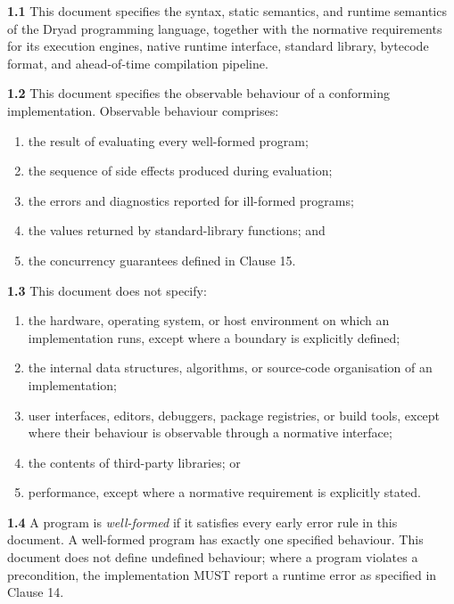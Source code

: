 \documentclass[
  english,
  11pt,
  a4paper,
]{article}
\providecommand{\tightlist}{%
  \setlength{\itemsep}{0pt}\setlength{\parskip}{0pt}}
\begin{document}
\textbf{1.1} This document specifies the syntax, static semantics, and
runtime semantics of the Dryad programming language, together with the
normative requirements for its execution engines, native runtime
interface, standard library, bytecode format, and ahead-of-time
compilation pipeline.

\textbf{1.2} This document specifies the observable behaviour of a
conforming implementation. Observable behaviour comprises:

\begin{enumerate}
\def\labelenumi{\arabic{enumi}.}
\tightlist
\item
  the result of evaluating every well-formed program;
\item
  the sequence of side effects produced during evaluation;
\item
  the errors and diagnostics reported for ill-formed programs;
\item
  the values returned by standard-library functions; and
\item
  the concurrency guarantees defined in Clause 15.
\end{enumerate}

\textbf{1.3} This document does not specify:

\begin{enumerate}
\def\labelenumi{\arabic{enumi}.}
\tightlist
\item
  the hardware, operating system, or host environment on which an
  implementation runs, except where a boundary is explicitly defined;
\item
  the internal data structures, algorithms, or source-code organisation
  of an implementation;
\item
  user interfaces, editors, debuggers, package registries, or build
  tools, except where their behaviour is observable through a normative
  interface;
\item
  the contents of third-party libraries; or
\item
  performance, except where a normative requirement is explicitly
  stated.
\end{enumerate}

\textbf{1.4} A program is \emph{well-formed} if it satisfies every early
error rule in this document. A well-formed program has exactly one
specified behaviour. This document does not define undefined behaviour;
where a program violates a precondition, the implementation MUST report
a runtime error as specified in Clause 14.
\end{document}
